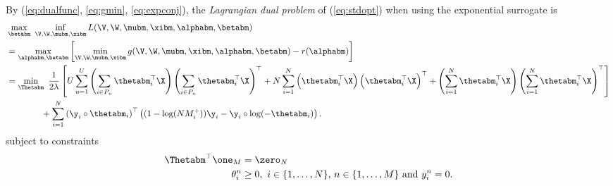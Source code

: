 By (\ref{eq:dualfunc}, \ref{eq:gmin}, \ref{eq:expconj}), the \emph{Lagrangian dual problem} of (\ref{eq:stdopt}) when using the exponential surrogate is
\begin{equation*}
\begin{aligned}
&\max_{\betabm} \ \inf_{\V, \W, \mubm, \xibm} L(\V, \W, \mubm, \xibm, \alphabm, \betabm) \\
&= \max_{\alphabm, \betabm} \left[ \min_{\V, \W, \mubm, \xibm} g(\V, \W, \mubm, \xibm, \alphabm, \betabm) - r(\alphabm) \right] \\
&= \min_{\Thetabm} \ \frac{1}{2 \lambda} \left[
     U \sum_{u=1}^U \left( \sum_{i \in P_u} \thetabm_i^\top \X \right) \left( \sum_{i \in P_u} \thetabm_i^\top \X \right)^\top
   + N \sum_{i=1}^N \left( \thetabm_i^\top \X \right) \left( \thetabm_i^\top \X \right)^\top
   + \left( \sum_{i=1}^N \thetabm_i^\top \X \right) \left( \sum_{i=1}^N \thetabm_i^\top \X \right)^\top \right] \\
& \hspace{4em}
   + \sum_{i=1}^N \left( \y_i \circ \thetabm_i \right)^\top 
     \left( (1 - \log(N M_i^+)) \y_i - \y_i \circ \log(-\thetabm_i) \right).
\end{aligned}
\end{equation*}
subject to constraints
\begin{equation*}
\begin{aligned}
\Thetabm^\top \one_M &= \zero_N \\
\theta_i^n & \ge 0, \ i \in \{1,\dots,N\}, \, n \in \{1,\dots,M\} \ \mathrm{and} \ y_i^n = 0.
\end{aligned}
\end{equation*}

